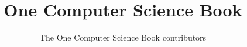 \documentclass[11pt,a4paper,twoside,openany]{book}
\title{One Computer Science Book}
\author{The One Computer Science Book contributors}
\date{\bookdate}
\begin{document}
\frontmatter




\tableofcontents

\mainmatter



\appendix
\part{\omsolutionspart}


\backmatter
\renewcommand{\indexspace}{\par\vskip 8pt plus 4pt minus 4pt\relax}
\printindex
\end{document}
